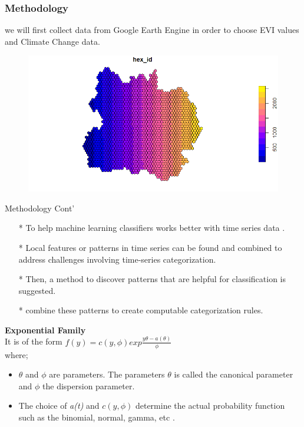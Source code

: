 \documentclass[11pt]{beamer}
\begin{document}
\begin{frame}
	\frametitle{Methodology}
we will first collect data from Google Earth Engine in order to choose  EVI values and Climate Change data.
\begin{figure}
	\centering
	\includegraphics[width=0.7\linewidth]{images/Rplot}
	\caption{}
	\label{fig:rplot}
\end{figure}


\end{frame}
\begin{frame}
	\begin{block}{Methodology Cont'}
		\begin{itemize}
		\item[*] To help machine learning classifiers works better with time series data .
		\item[*] Local features or patterns in time series can be found and combined to address challenges involving time-series categorization.
		\item[*] Then, a method to discover patterns that are helpful for classification is suggested.
		\item[*] combine these patterns to create computable categorization rules. 
	\end{itemize}
\textbf{Exponential Family}\\

It is of the form 
$f(y) = c(y,\phi)exp{\frac{y\theta - a(\theta)}{\phi}}$\\
where;\\
\begin{itemize}
	\item  $\theta$ and $\phi$ are parameters. The parameters $\theta$ is called the canonical parameter and  $\phi$ the dispersion parameter.  \\
\item   The choice of \emph{a(t)} and $c(y,\phi)$ determine the actual probability function such as the binomial, normal, gamma, etc .\\ 
\end{itemize}
	\end{block}
\end{frame}
\end{document}
